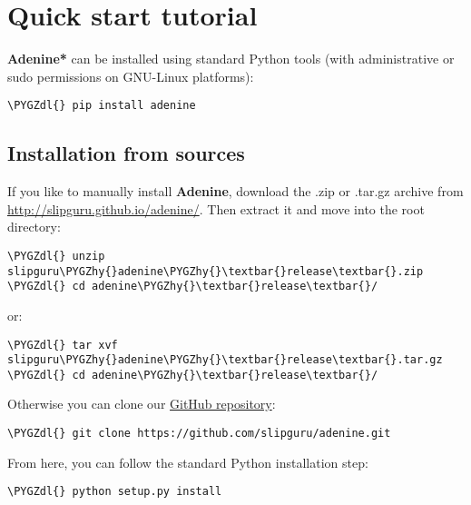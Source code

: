 \documentclass[letterpaper,10pt,english]{sphinxmanual}
\def\PYGZdl{\char`\$}
\def\PYGZhy{\char`\-}
\begin{document}
\section{Quick start tutorial}
\label{tutorial::doc}\label{tutorial:quick-start-tutorial}\label{tutorial:tutorial}
\textbf{Adenine*} can be installed using standard Python tools (with
administrative or sudo permissions on GNU-Linux platforms):

\begin{Verbatim}[commandchars=\\\{\}]
\PYGZdl{} pip install adenine
\end{Verbatim}


\subsection{Installation from sources}
\label{tutorial:installation-from-sources}
If you like to manually install \textbf{Adenine}, download the .zip or .tar.gz archive
from \url{http://slipguru.github.io/adenine/}. Then extract it and move into the root directory:

\begin{Verbatim}[commandchars=\\\{\}]
\PYGZdl{} unzip slipguru\PYGZhy{}adenine\PYGZhy{}\textbar{}release\textbar{}.zip
\PYGZdl{} cd adenine\PYGZhy{}\textbar{}release\textbar{}/
\end{Verbatim}

or:

\begin{Verbatim}[commandchars=\\\{\}]
\PYGZdl{} tar xvf slipguru\PYGZhy{}adenine\PYGZhy{}\textbar{}release\textbar{}.tar.gz
\PYGZdl{} cd adenine\PYGZhy{}\textbar{}release\textbar{}/
\end{Verbatim}

Otherwise you can clone our \href{https://github.com/slipguru/adenine}{GitHub repository}:

\begin{Verbatim}[commandchars=\\\{\}]
\PYGZdl{} git clone https://github.com/slipguru/adenine.git
\end{Verbatim}

From here, you can follow the standard Python installation step:

\begin{Verbatim}[commandchars=\\\{\}]
\PYGZdl{} python setup.py install
\end{Verbatim}
\end{document}

